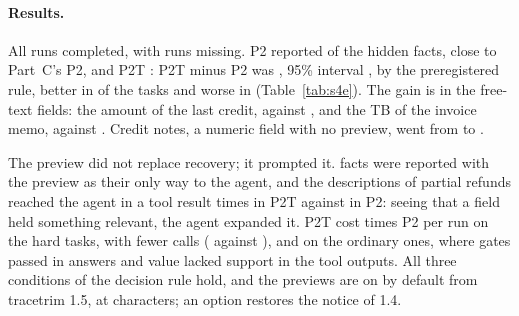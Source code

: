 \begin{table}[t]
\centering\small

\caption{Study~4E: the frozen projection with the skill text of version~2, without (P2) and with
\SfourEPreview{}-character text previews (P2T), on the tasks of Part~B (\SfourERunsPerArm{} runs per arm); costs and
gates also on the ordinary tasks of Part~A. Shares averaged within task, tasks weighted equally. Intervals: 95\%
bootstrap over tasks. The primary outcome and its interval are in bold.}
\label{tab:s4e}
\end{table}

\paragraph{Results.} All \SfourERuns{} runs completed, with \SfourEMissing{} runs missing. P2 reported
\SfourEHiddenPtwo{} of the hidden facts, close to Part~C's P2, and P2T \SfourEHiddenPtwoT{}: P2T minus P2 was
\textbf{\SfourEPoint{}}, 95\% interval \textbf{\SfourECI{}}, \emph{\SfourEVerdict} by the preregistered rule, better
in \SfourEBetterTasks{} of the \SfourEHardTasks{} tasks and worse in \SfourEWorseTasks{} (Table~\ref{tab:s4e}). The gain is in the
free-text fields: the amount of the last credit, \SfourEOriginPtwo{} against \SfourEOriginPtwoT{}, and the TB of the
invoice memo, \SfourEMemoPtwo{} against \SfourEMemoPtwoT{}. Credit notes, a numeric field with no preview, went from
\SfourECreditNotePtwo{} to \SfourECreditNotePtwoT{}.

The preview did not replace recovery; it prompted it. \SfourEFromPreviewOnly{} facts were reported with the preview as
their only way to the agent, and the descriptions of partial refunds reached the agent in a tool result
\SfourERefundReachedPtwoT{} times in P2T against \SfourERefundReachedPtwo{} in P2: seeing that a field held something
relevant, the agent expanded it. P2T cost \SfourEHardCost{} times P2 per run on the hard tasks, with fewer calls
(\SfourECallsPtwoT{} against \SfourECallsPtwo{}), and \SfourEOrdinaryCost{} on the ordinary ones, where gates passed
in \SfourEOrdinaryGates{} answers and \SfourEUnsupported{} value lacked support in the tool outputs. All three
conditions of the decision rule hold, and the previews are on by default from tracetrim 1.5, at
\SfourEPreview{} characters; an option restores the notice of 1.4.

